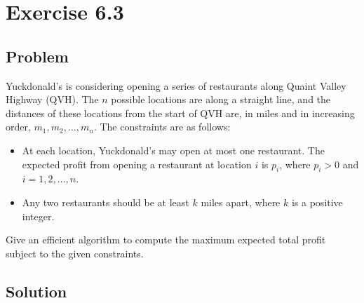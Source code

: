 \documentclass[12pt, letterpaper]{article}
\begin{document}
\section{Exercise 6.3}

\subsection{Problem}

Yuckdonald's is considering opening a series of restaurants along Quaint Valley Highway (QVH). The \(n\) possible locations are along a straight line, and the distances of these locations from the start of QVH are, in miles and in increasing order, \(m_1, m_2, \dots, m_n\). The constraints are as follows:

\begin{itemize}
    \item At each location, Yuckdonald's may open at most one restaurant. The expected profit from opening a restaurant at location \(i\) is \(p_i\), where \(p_i > 0\) and \(i = 1,2,\dots,n\).
    \item Any two restaurants should be at least \(k\) miles apart, where \(k\) is a positive integer.
\end{itemize}
    
Give an efficient algorithm to compute the maximum expected total profit subject to the given constraints.

\subsection{Solution}

\end{document}
